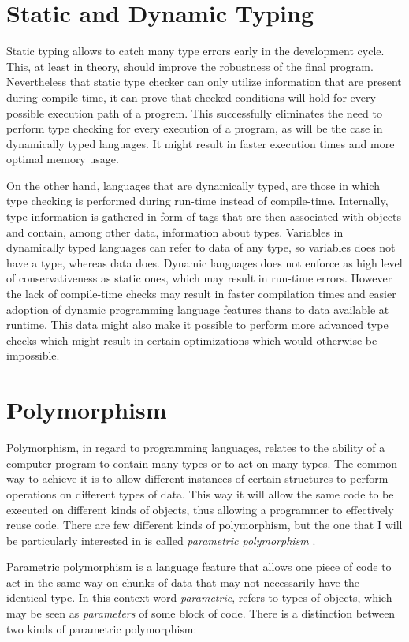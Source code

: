 \documentclass[12pt,a4paper]{report}
\begin{document}
\section{Static and Dynamic Typing}
Static typing allows to catch many type errors early in the development cycle.
This, at least in theory, should improve the robustness of the final program.
Nevertheless that static type checker can only utilize information that are
present during compile-time, it can prove that checked conditions will hold for
every possible execution path of a progrem. This successfully eliminates the
need to perform type checking for every execution of a program, as will be the
case in dynamically typed languages. It might result in faster execution times
and more optimal memory usage.

On the other hand, languages that are dynamically typed, are those in which
type checking is performed during run-time instead of compile-time. Internally,
type information is gathered in form of tags that are then associated with
objects and contain, among other data, information about types. Variables in
dynamically typed languages can refer to data of any type, so variables does
not have a type, whereas data does. Dynamic languages does not enforce as high
level of conservativeness as static ones, which may result in run-time errors.
However the lack of compile-time checks may result in faster compilation times
and easier adoption of dynamic programming language features thans to data
available at runtime. This data might also make it possible to perform more
advanced type checks which might result in certain optimizations which would
otherwise be impossible.

\section{Polymorphism}
Polymorphism, in regard to programming languages, relates to the ability of a
computer program to contain many types or to act on many types. The common way
to achieve it is to allow different instances of certain structures to perform
operations on different types of data. This way it will allow the same code to
be executed on different kinds of objects, thus allowing a programmer to
effectively reuse code. There are few different kinds of polymorphism, but the
one that I will be particularly interested in is called \textit{parametric
polymorphism} \cite{Car88}.

Parametric polymorphism is a language feature that allows one piece of code to
act in the same way on chunks of data that may not necessarily have the
identical type. In this context word \textit{parametric}, refers to types of
objects, which may be seen as \textit{parameters} of some block of code. There is a
distinction between two kinds of parametric polymorphism:
\end{document}
